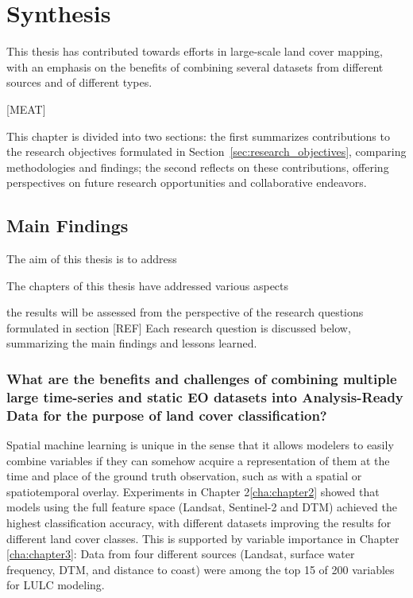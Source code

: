 \chapter[Synthesis]{Synthesis}
\label{cha:Chapter6}
\newpage

This thesis has contributed towards efforts in large-scale land cover mapping, with an emphasis on the benefits of combining several datasets from different sources and of different types.

[MEAT]

This chapter is divided into two sections: the first summarizes contributions to the research objectives formulated in Section~\ref{sec:research_objectives}, comparing methodologies and findings; the second reflects on these contributions, offering perspectives on future research opportunities and collaborative endeavors. 

\section{Main Findings}

    The aim of this thesis is to address
    
    The chapters of this thesis have addressed various aspects
    
    the results will be assessed from the perspective of the research questions formulated in section [REF] Each research question is discussed below, summarizing the main findings and lessons learned.
    
    \subsection{What are the benefits and challenges of combining multiple large time-series and static EO datasets into Analysis-Ready Data for the purpose of land cover classification?}
        
        Spatial machine learning is unique in the sense that it allows modelers to easily combine variables if they can somehow acquire a representation of them at the time and place of the ground truth observation, such as with a spatial or spatiotemporal overlay. Experiments in Chapter 2\ref{cha:chapter2} showed that models using the full feature space (Landsat, Sentinel-2 and DTM) achieved the highest classification accuracy, with different datasets improving the results for different land cover classes. This is supported by variable importance in Chapter \ref{cha:chapter3}: Data from four different sources (Landsat, surface water frequency, DTM, and distance to coast) were among the top 15 of 200 variables for LULC modeling.
        
